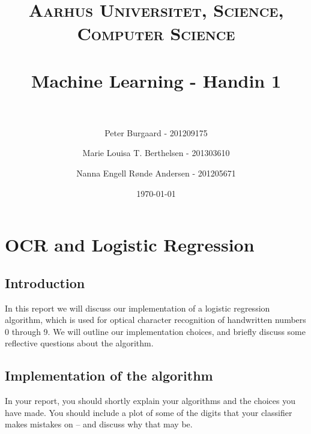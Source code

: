 \documentclass[paper=a4, fontsize=11pt]{scrartcl} %
\title{	
	\normalfont \normalsize 
	\textsc{Aarhus Universitet, Science, Computer Science} \\ [25pt] %
	\horrule{0.5pt} \\[0.4cm] %
	\huge Machine Learning - Handin 1 \\ %
	\horrule{2pt} \\[0.5cm] %
}
\author{Peter Burgaard - 201209175 \and Marie Louisa T. Berthelsen - 201303610 \and Nanna Engell Rønde Andersen - 201205671} %
\date{\normalsize\today} %
\numberwithin{equation}{section} %
\numberwithin{figure}{section} %
\numberwithin{table}{section} %
\begin{document}
\maketitle
\section{OCR and Logistic Regression}
\subsection*{Introduction}
In this report we will discuss our implementation of a logistic regression algorithm, which is used for optical character recognition of handwritten numbers 0 through 9. We will outline our implementation choices, and briefly discuss some reflective questions about the algorithm.

\subsection*{Implementation of the algorithm}

In your report, you should shortly explain your algorithms and the choices you have made. You should include a plot of some of the digits that your classifier makes mistakes on -- and discuss why that may be. \\ \\
\end{document}

